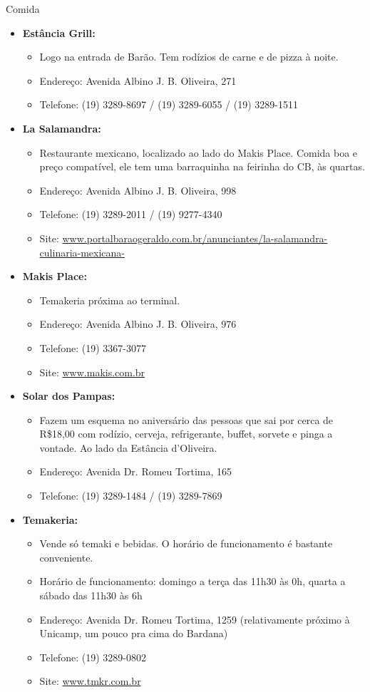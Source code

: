\begin{story}{Comida}
\begin{itemize}
\item \textbf{Estância Grill:}
\begin{itemize}
\item Logo na entrada de Barão. Tem rodízios de carne e de pizza à noite. 
\item Endereço: Avenida Albino J. B. Oliveira, 271
\item Telefone: (19) 3289-8697 / (19) 3289-6055 / (19) 3289-1511
\end{itemize}

\item \textbf{La Salamandra:}
\begin{itemize}
\item Restaurante mexicano, localizado ao lado do Makis Place. Comida boa e preço compatível, ele tem uma barraquinha na feirinha do CB, às quartas.
\item Endereço: Avenida Albino J. B. Oliveira, 998
\item Telefone: (19) 3289-2011 / (19) 9277-4340
\item Site: \url{www.portalbaraogeraldo.com.br/anunciantes/la-salamandra-culinaria-mexicana-}
\end{itemize}

\item \textbf{Makis Place:}
\begin{itemize}
\item Temakeria próxima ao terminal.
\item Endereço: Avenida Albino J. B. Oliveira, 976
\item Telefone: (19) 3367-3077 
\item Site: \url{www.makis.com.br}
\end{itemize}

\item \textbf{Solar dos Pampas:}
\begin{itemize}
\item Fazem um esquema no aniversário das pessoas que sai por cerca de R\$18,00 com rodízio, cerveja, refrigerante, buffet, sorvete e pinga a vontade. Ao lado da Estância d'Oliveira.
\item Endereço: Avenida Dr. Romeu Tortima, 165
\item Telefone: (19) 3289-1484 / (19) 3289-7869
\end{itemize}

\item \textbf{Temakeria:}
\begin{itemize}
\item Vende só temaki e bebidas. O horário de funcionamento é bastante conveniente.
\item Horário de funcionamento: domingo a terça das 11h30 às 0h, quarta a sábado das 11h30 às 6h
\item Endereço: Avenida Dr. Romeu Tortima, 1259 (relativamente próximo à Unicamp, um pouco pra cima do Bardana)
\item Telefone: (19) 3289-0802
\item Site: \url{www.tmkr.com.br}
\end{itemize}


\end{itemize}
\end{story}
